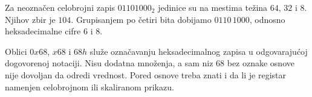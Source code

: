 
Za neoznačen celobrojni zapis $01101000_2$ jedinice su na mestima težina $64$, $32$ i $8$. Njihov zbir je $104$. Grupisanjem po četiri bita dobijamo $0110\,1000$, odnosno heksadecimalne cifre $6$ i $8$.

Oblici $0x68$, $x68$ i $68h$ služe označavanju heksadecimalnog zapisa u odgovarajućoj dogovorenoj notaciji. Nisu dodatna množenja, a sam niz $68$ bez oznake osnove nije dovoljan da odredi vrednost. Pored osnove treba znati i da li je registar namenjen celobrojnom ili skaliranom prikazu.
